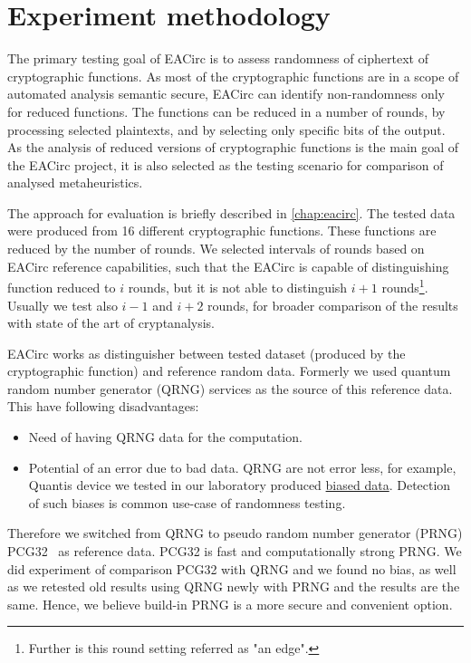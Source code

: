 \documentclass[
  print, %
  Table,   %
  nolof,     %
  nolot,     %
  11pt, %
  oneside  %
]{fithesis3}
\begin{document}
\chapter{Experiment methodology}
\label{chap:method}

The primary testing goal of EACirc is to assess randomness of ciphertext of cryptographic functions. As most of the cryptographic functions are in a scope of automated analysis semantic secure, EACirc can identify non-randomness only for reduced functions. The functions can be reduced in a number of rounds, by processing selected plaintexts, and by selecting only specific bits of the output. As the analysis of reduced versions of cryptographic functions is the main goal of the EACirc project, it is also selected as the testing scenario for comparison of analysed metaheuristics.

The approach for evaluation is briefly described in \cref{chap:eacirc}. The tested data were produced from 16 different cryptographic functions. These functions are reduced by the number of rounds. We selected intervals of rounds based on EACirc reference capabilities, such that the EACirc is capable of distinguishing function reduced to $i$ rounds, but it is not able to distinguish $i+1$ rounds\footnote{Further is this round setting referred as "an edge".}. Usually we test also $i-1$ and $i+2$ rounds, for broader comparison of the results with state of the art of cryptanalysis.

EACirc works as distinguisher between tested dataset (produced by the cryptographic function) and reference random data. Formerly we used quantum random number generator (QRNG) services as the source of this reference data. This have following disadvantages:

\begin{itemize}
    \item Need of having QRNG data for the computation.
    \item Potential of an error due to bad data. QRNG are not error less, for example, Quantis device we tested in our laboratory produced \href{http://rtt.ics.muni.cz/ViewResults/Experiment/1732/}{biased data}. Detection of such biases is common use-case of randomness testing.
\end{itemize}

Therefore we switched from QRNG to pseudo random number generator (PRNG) PCG32~\cite{pcgGen} as reference data. PCG32 is fast and computationally strong PRNG. We did experiment of comparison PCG32 with QRNG and we found no bias, as well as we retested old results using QRNG newly with PRNG and the results are the same. Hence, we believe build-in PRNG is a more secure and convenient option.
\end{document}
